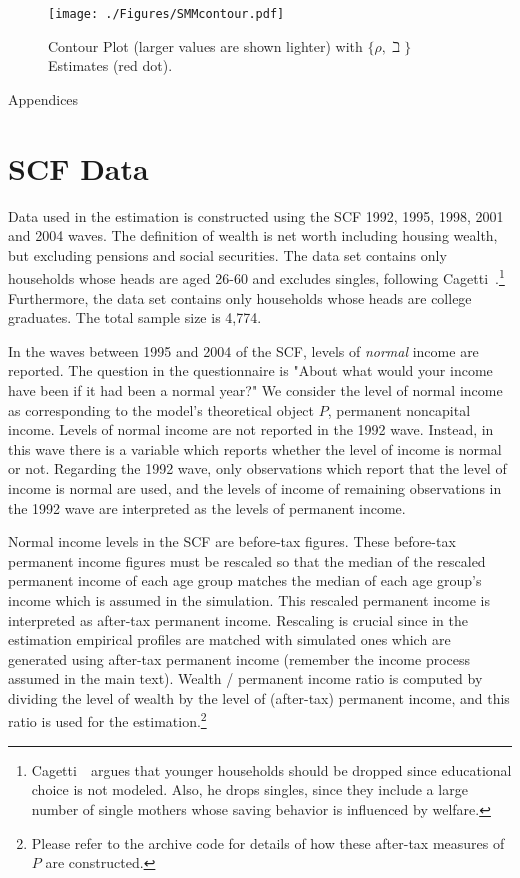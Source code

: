 \documentclass[titlepage, headings=optiontotocandhead]{Resources/texmf-local/tex/latex/econtex}
\begin{document}
\hypertarget{PlotContourMedianStrEst}{}
\begin{figure}
  \texttt{[image: ./Figures/SMMcontour.pdf]}
  \caption{Contour Plot (larger values are shown lighter) with $\{\rho,\beth\}$ Estimates (red dot).}
  \label{fig:PlotContourMedianStrEst}
\end{figure}



\clearpage\vfill\eject

\centerline{\LARGE Appendices}\vspace{0.2in}

\appendix


\hypertarget{scf-data}{}
\section{SCF Data}\label{app:scf-data}

Data used in the estimation is constructed using the SCF 1992, 1995, 1998, 2001 and 2004 waves. The definition of wealth is net worth including housing wealth, but excluding pensions and social securities. The data set contains only households whose heads are aged 26-60 and excludes singles, following Cagetti~\citeyearpar{cagettiWprofiles}.\footnote{Cagetti~\citeyearpar{cagettiWprofiles}\ argues that younger households should be dropped since educational choice is not modeled. Also, he drops singles, since they include a large number of single mothers whose saving behavior is influenced by welfare.} Furthermore, the data set contains only households whose heads are college graduates. The total sample size is 4,774.

In the waves between 1995 and 2004 of the SCF, levels of \textit{normal} income are reported. The question in the questionnaire is "About what would your income have been if it had been a normal year?" We consider the level of normal income as corresponding to the model's theoretical object $P$, permanent noncapital income. Levels of normal income are not reported in the 1992 wave. Instead, in this wave there is a variable which reports whether the level of income is normal or not. Regarding the 1992 wave, only observations which report that the level of income is normal are used, and the levels of income of remaining observations in the 1992 wave are interpreted as the levels of permanent income.

Normal income levels in the SCF are before-tax figures. These before-tax permanent income figures must be rescaled so that the median of the rescaled permanent income of each age group matches the median of each age group's income which is assumed in the simulation. This rescaled permanent income is interpreted as after-tax permanent income. Rescaling is crucial since in the estimation empirical profiles are matched with simulated ones which are generated using after-tax permanent income (remember the income process assumed in the main text). Wealth / permanent income ratio is computed by dividing the level of wealth by the level of (after-tax) permanent income, and this ratio is used for the estimation.\footnote{Please refer to the archive code for details of how these after-tax measures of $P$ are constructed.}
\end{document}
